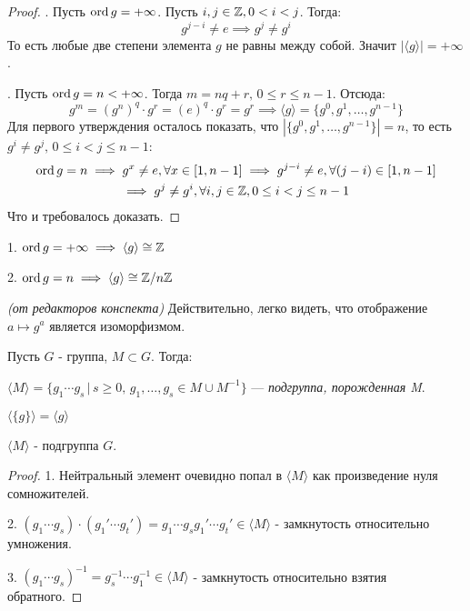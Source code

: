 \documentclass[../main.tex]{subfiles}
\begin{document}
\begin{proof}
    . Пусть $\operatorname{ord} g = +\infty$. Пусть $i, j \in \mathbb{Z}, 0 < i < j$. Тогда:
    \begin{equation*}
        g^{j - i} \neq e \implies g^{j} \neq g^{i}
    \end{equation*}
    То есть любые две степени элемента $g$ не равны между собой. Значит $|\langle g \rangle| = +\infty$.

    . Пусть $\operatorname{ord} g = n < +\infty$. Тогда $m = nq + r, \, 0 \leq r \leq n - 1$. Отсюда:
    \begin{equation*}
        g^m = (g^n)^{q} \cdot g^r = (e)^{q} \cdot g^r = g^r \implies \langle g \rangle = \{g^0, g^1, \dotsc, g^{n - 1}\}
    \end{equation*}
    Для первого утверждения осталось показать, что $|\{g^0, g^1, \dotsc, g^{n - 1}\}| = n$, то есть $g^i \ne g^j, \, 0 \leq i < j \leq n - 1$:
    \begin{equation*}
    \begin{gathered}
        \operatorname{ord} g = n \implies g^x \neq e, \forall x \in [1, n - 1]  \implies g^{j - i} \neq e,\forall (j - i) \in [1, n - 1] \\
        \implies g^{j} \neq g^{i}, \forall i,j \in \mathbb{Z}, 0 \leq i < j \leq n - 1
    \end{gathered}
    \end{equation*}
    Что и требовалось доказать.
\end{proof}
\begin{remark}
    1. $\operatorname{ord} g = +\infty \implies \langle g \rangle \cong \mathbb{Z}$

    2. $\operatorname{ord} g = n \implies \langle g \rangle \cong \mathbb{Z}/n\mathbb{Z}$

    \textit{(от редакторов конспекта)} Действительно, легко видеть, что отображение $a \mapsto g^a$ является изоморфизмом.
\end{remark}
\begin{definition}
    Пусть $G$ - группа, $M \subset G$. Тогда:

    $\langle M \rangle = \{g_1 \dotsm g_s \, | \, s \geq 0,\, g_1, \dotsc, g_s \in M \cup M^{-1}\}$ --- \textit{подгруппа, порожденная M}.
\end{definition}
\begin{remark}
    $\langle \{g\} \rangle = \langle g \rangle$
\end{remark}
\begin{theorem-non}
    $\langle M \rangle$ - подгруппа $G$.
\end{theorem-non}
\begin{proof}
    1. Нейтральный элемент очевидно попал в $\langle M \rangle$ как произведение нуля сомножителей.

    2. $(g_1 \dotsm g_s) \cdot (g_1' \dotsm g_t') = g_1 \dotsm g_s g_1' \dotsm g_t' \in \langle M \rangle$ - замкнутость относительно умножения.

    3. $(g_1 \dotsm g_s)^{-1} = g_s^{-1} \dotsm g_1^{-1} \in \langle M \rangle$ - замкнутость относительно взятия обратного.
\end{proof}
\end{document}
